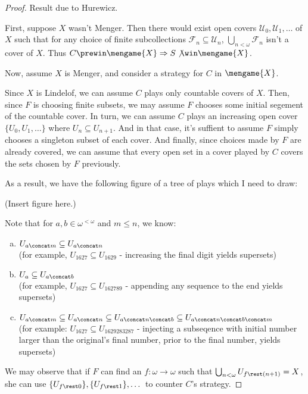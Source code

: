   \begin{proof}
    Result due to Hurewicz.

    First, suppose $X$ wasn't Menger. Then there would exist open covers $\mathcal{U}_0,\mathcal{U}_1,\dots$ of $X$ such that for any choice of finite subcollections $\mathcal{F}_n\subseteq\mathcal{U}_n$, $\bigcup_{n<\omega} \mathcal{F}_n$ isn't a cover of $X$. Thus $C\prewin\mengame{X} \Rightarrow S \not\win\mengame{X}$.

    Now, assume $X$ is Menger, and consider a strategy for $C$ in $\mengame{X}$.

    Since $X$ is Lindelof, we can assume $C$ plays only countable covers of $X$. Then, since $F$ is choosing finite subsets, we may assume $F$ chooses some initial segement of the countable cover. In turn, we can assume $C$ plays an increasing open cover $\{U_0,U_1,\dots\}$ where $U_n\subseteq U_{n+1}$. And in that case, it's suffient to assume $F$ simply chooses a singleton subset of each cover. And finally, since choices made by $F$ are already covered, we can assume that every open set in a cover played by $C$ covers the sets chosen by $F$ previously.

    As a result, we have the following figure of a tree of plays which I need to draw:

    (Insert figure here.)

    Note that for $a,b\in\omega^{<\omega}$ and $m\leq n$, we know:
      \begin{enumerate}[(a)]
        \item $U_{a\concat m}\subseteq U_{a\concat n}$ \\ (for example, $U_{1627} \subseteq U_{1629}$ - increasing the final digit yields supersets)
        \item $U_a \subseteq U_{a\concat b}$ \\ (for example, $U_{1627}\subseteq U_{162789}$ - appending any sequence to the end yields supersets)
        \item $U_{a\concat m} \subseteq U_{a\concat n} \subseteq U_{a\concat n\concat b} \subseteq U_{a\concat n\concat b\concat m}$ \\ (for example: $U_{1627} \subseteq U_{1629283287}$ - injecting a subseqence with initial number larger than the original's final number, prior to the final number, yields supersets) 
      \end{enumerate}

    We may observe that if $F$ can find an $f:\omega\to\omega$ such that $\bigcup_{n<\omega}U_{f\rest (n+1)} = X$, she can use $\{U_{f\rest 0}\}, \{U_{f\rest 1}\}, \dots$ to counter $C$'s strategy.


\end{proof}
